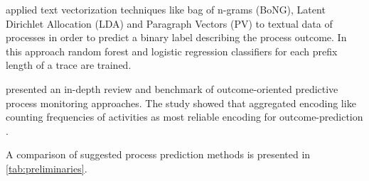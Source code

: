 \citeauthor{DBLP:conf/bpm/TeinemaaDMF16} applied text vectorization techniques like bag of n-grams (BoNG), Latent Dirichlet Allocation (LDA) and Paragraph Vectors (PV) to textual data of processes in order to predict a binary label describing the process outcome\cite{DBLP:conf/bpm/TeinemaaDMF16}.
In this approach random forest and logistic regression classifiers for each prefix length of a trace are trained.

\citeauthor{DBLP:journals/tkdd/TeinemaaDRM19} presented an in-depth review and benchmark of outcome-oriented predictive process monitoring approaches.
The study showed that aggregated encoding like counting frequencies of activities as most reliable encoding for outcome-prediction \cite{DBLP:journals/tkdd/TeinemaaDRM19}.

A comparison of suggested process prediction methods is presented in \ref{tab:preliminaries}.

